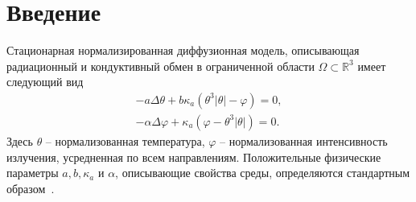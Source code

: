 \documentclass[10pt]{article}
\begin{document}
    \section{Введение}\label{sec:intro}
    Стационарная нормализированная диффузионная модель, описывающая радиационный и кондуктивный
    обмен в ограниченной области $\Omega \subset \mathbb{R}^3$ имеет следующий вид~\cite{modest-rht}
    \begin{equation}
        \label{initial}
        \begin{aligned}
            - a \Delta \theta + b \kappa_a(\theta ^ 3 | \theta | - \varphi) = 0,  \\
            - \alpha \Delta \varphi + \kappa_a (\varphi - \theta ^3 | \theta |) = 0.
        \end{aligned}
    \end{equation}
    Здесь $\theta$ – нормализованная температура,
    $\varphi$ – нормализованная интенсивность излучения, усредненная по всем направлениям.
    Положительные физические параметры $a, b, \kappa_a $ и $\alpha$,
    описывающие свойства среды, определяются стандартным образом~\cite{covt-cheb-unique}.
\end{document}
